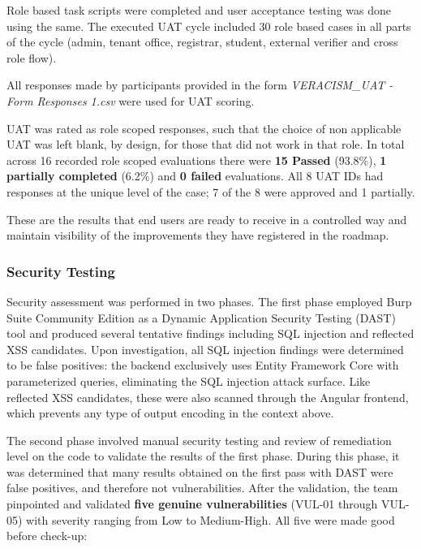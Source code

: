 Role based task scripts were completed and user acceptance testing was done using the same. The executed UAT cycle included 30 role based cases in all parts of the cycle (admin, tenant office, registrar, student, external verifier and cross role flow).

All responses made by participants provided in the form
\textit{VERACISM\_UAT - Form Responses 1.csv} were used for UAT scoring.

UAT was rated as role scoped responses, such that the choice of non applicable UAT was left blank, by design, for those that did not work in that role. In total across 16 recorded role scoped evaluations there were \textbf{15 Passed} (93.8\%), \textbf{1 partially completed} (6.2\%) and \textbf{0 failed} evaluations. All 8 UAT IDs had responses at the unique level of the case; 7 of the 8 were approved and 1 partially.

These are the results that end users are ready to receive in a controlled way and maintain visibility of the improvements they have registered in the roadmap.

\subsubsection{Security Testing}

Security assessment was performed in two phases. The first phase employed Burp Suite
Community Edition as a Dynamic Application Security Testing (DAST) tool and produced several
tentative findings including SQL injection and reflected XSS candidates. Upon investigation, all
SQL injection findings were determined to be false positives: the backend exclusively uses Entity
Framework Core with parameterized queries, eliminating the SQL injection attack surface.
Like reflected XSS candidates, these were also scanned through the Angular frontend, which prevents any type of output encoding in the context above.

The second phase involved manual security testing and review of remediation level on the code to validate the results of the first phase. During this phase, it was determined that many results obtained on the first pass with DAST were false positives, and therefore not vulnerabilities. After the validation, the team pinpointed
and validated
\textbf{five genuine vulnerabilities} (VUL-01 through VUL-05) with severity ranging from Low to Medium-High. All five were made good before check-up:

